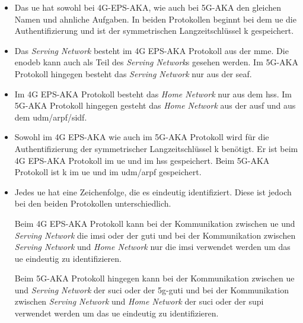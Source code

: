 \begin{itemize}
\item Das \gls{ue} hat sowohl bei 4G-EPS-AKA, wie auch bei 5G-AKA den gleichen Namen und ahnliche Aufgaben.
In beiden Protokollen beginnt bei dem \gls{ue} die Authentifizierung und ist der symmetrischen Langzeitschlüssel \gls{k} gespeichert.

\item Das \textit{Serving Network} besteht im 4G EPS-AKA Protokoll aus der \gls{mme}. 
Die \gls{enodeb} kann auch als Teil des \textit{Serving Network}s gesehen werden.
Im 5G-AKA Protokoll hingegen besteht das \textit{Serving Network} nur aus der \gls{seaf}.

\item Im 4G EPS-AKA Protokoll besteht das \textit{Home Network} nur aus dem \gls{hss}.
Im 5G-AKA Protokoll hingegen gesteht das \textit{Home Network} aus der \gls{ausf} und aus dem \gls{udm}/\gls{arpf}/\gls{sidf}.

\item Sowohl im 4G EPS-AKA wie auch im 5G-AKA Protokoll wird für die Authentifizierung der symmetrischer Langzeitschlüssel \gls{k} benötigt.
Er ist beim 4G EPS-AKA Protokoll im \gls{ue} und im \gls{hss} gespeichert.
Beim 5G-AKA Protokoll ist \gls{k} im \gls{ue} und im \gls{udm}/\gls{arpf} gespeichert.

\item Jedes \gls{ue} hat eine Zeichenfolge, die es eindeutig identifiziert.
Diese ist jedoch bei den beiden Protokollen unterschiedlich.

Beim 4G EPS-AKA Protokoll kann bei der Kommunikation zwischen \gls{ue} und \textit{Serving Network} die \gls{imsi} oder der \gls{guti} und bei der Kommunikation zwischen \textit{Serving Network} und \textit{Home Network} nur die \gls{imsi} verwendet werden um das \gls{ue} eindeutig zu identifizieren.

Beim 5G-AKA Protokoll hingegen kann bei der Kommunikation zwischen \gls{ue} und \textit{Serving Network} der \gls{suci} oder der \gls{5g-guti} und bei der Kommunikation zwischen \textit{Serving Network} und \textit{Home Network} der \gls{suci} oder der \gls{supi} verwendet werden um das \gls{ue} eindeutig zu identifizieren.
\end{itemize}
